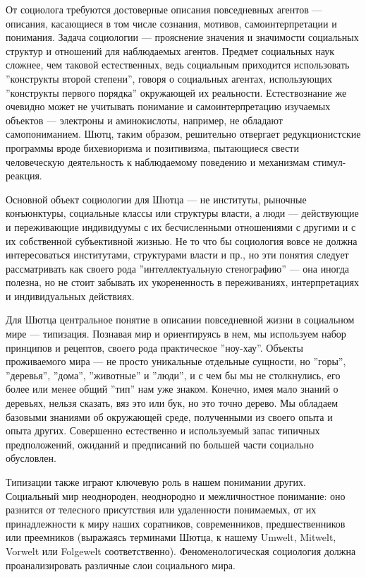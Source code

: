 \documentclass[11pt]{book}
\begin{document}
От социолога требуются достоверные описания повседневных агентов --- описания, касающиеся в том числе сознания, мотивов, самоинтерпретации и понимания. Задача социологии --- прояснение значения и значимости социальных структур и отношений для наблюдаемых агентов. Предмет социальных наук сложнее, чем таковой естественных, ведь социальным приходится использовать ''конструкты второй степени'', говоря о социальных агентах, использующих ''конструкты первого порядка'' окружающей их реальности. Естествознание же очевидно может не учитывать понимание и самоинтерпретацию изучаемых объектов --- электроны и аминокислоты, например, не обладают самопониманием. Шютц, таким образом, решительно отвергает редукционистские программы вроде бихевиоризма и позитивизма, пытающиеся свести человеческую деятельность к наблюдаемому поведению и механизмам стимул-реакция.

Основной объект социологии для Шютца --- не институты, рыночные конъюнктуры, социальные классы или структуры власти, а люди --- действующие и переживающие индивидуумы с их бесчисленными отношениями с другими и с их собственной субъективной жизнью. Не то что бы социология вовсе не должна интересоваться институтами, структурами власти и пр., но эти понятия следует рассматривать как своего рода ''интеллектуальную стенографию'' --- она иногда полезна, но не стоит забывать их укорененность в переживаниях, интерпретациях и индивидуальных действиях.

Для Шютца центральное понятие в описании повседневной жизни в социальном мире --- типизация. Познавая мир и ориентируясь в нем, мы используем набор принципов и рецептов, своего рода практическое ''ноу-хау''. Объекты проживаемого мира --- не просто уникальные отдельные сущности, но ''горы'', ''деревья'', ''дома'', ''животные'' и ''люди'', и с чем бы мы не столкнулись, его более или менее общий ''тип'' нам уже знаком. Конечно, имея мало знаний о деревьях, нельзя сказать, вяз это или бук, но это точно дерево. Мы обладаем базовыми знаниями об окружающей среде, полученными из своего опыта и опыта других. Совершенно естественно и используемый запас типичных предположений, ожиданий и предписаний по большей части социально обусловлен.

Типизации также играют ключевую роль в нашем понимании других. Социальный мир неоднороден, неоднородно и межличностное понимание: оно разнится от телесного присутствия или удаленности понимаемых, от их принадлежности к миру наших соратников, современников, предшественников или преемников (выражаясь терминами Шютца, к нашему Umwelt, Mitwelt, Vorwelt или Folgewelt соответственно). Феноменологическая социология должна проанализировать различные слои социального мира.
\end{document}
